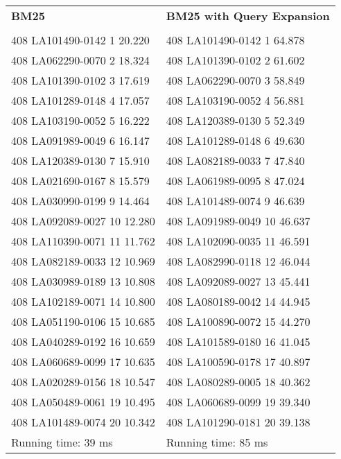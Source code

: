 \begin{tabular}{ l l }
\textbf{BM25} & \textbf{BM25 with Query Expansion}\\
\\
408 LA101490-0142 1 20.220 & 408 LA101490-0142 1 64.878\\
408 LA062290-0070 2 18.324 & 408 LA101390-0102 2 61.602\\
408 LA101390-0102 3 17.619 & 408 LA062290-0070 3 58.849\\
408 LA101289-0148 4 17.057 & 408 LA103190-0052 4 56.881\\
408 LA103190-0052 5 16.222 & 408 LA120389-0130 5 52.349\\
408 LA091989-0049 6 16.147 & 408 LA101289-0148 6 49.630\\
408 LA120389-0130 7 15.910 & 408 LA082189-0033 7 47.840\\
408 LA021690-0167 8 15.579 & 408 LA061989-0095 8 47.024\\
408 LA030990-0199 9 14.464 & 408 LA101489-0074 9 46.639\\
408 LA092089-0027 10 12.280 & 408 LA091989-0049 10 46.637\\
408 LA110390-0071 11 11.762 & 408 LA102090-0035 11 46.591\\
408 LA082189-0033 12 10.969 & 408 LA082990-0118 12 46.044\\
408 LA030989-0189 13 10.808 & 408 LA092089-0027 13 45.441\\
408 LA102189-0071 14 10.800 & 408 LA080189-0042 14 44.945\\
408 LA051190-0106 15 10.685 & 408 LA100890-0072 15 44.270\\
408 LA040289-0192 16 10.659 & 408 LA101589-0180 16 41.045\\
408 LA060689-0099 17 10.635 & 408 LA100590-0178 17 40.897\\
408 LA020289-0156 18 10.547 & 408 LA080289-0005 18 40.362\\
408 LA050489-0061 19 10.495 & 408 LA060689-0099 19 39.340\\
408 LA101489-0074 20 10.342 & 408 LA101290-0181 20 39.138\\
Running time: 39 ms & Running time: 85 ms\\
\end{tabular}